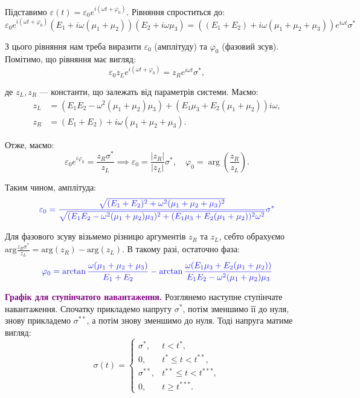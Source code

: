 \documentclass{hw_template}
\begin{document}
Підставимо $\varepsilon(t) = \varepsilon_0 e^{i(\omega t + \varphi_0)}$. Рівняння спроститься до:
\begin{equation*}
    \varepsilon_0e^{i(\omega t + \varphi_0)}(E_1+i\omega(\mu_1+\mu_2))(E_2+i\omega \mu_3) = \left((E_1 + E_2) + i\omega\left(\mu_1+\mu_2+\mu_3\right)\right)e^{i\omega t}\sigma^*
\end{equation*}

З цього рівняння нам треба виразити $\varepsilon_0$ (амплітуду) та $\varphi_0$ (фазовий зсув). Помітимо, що рівняння має вигляд:
\begin{equation*}
    \varepsilon_0z_L e^{i(\omega t + \varphi_0)} = z_R e^{i\omega t}\sigma^*,
\end{equation*}

де $z_L,z_R$ --- константи, що залежать від параметрів системи. Маємо:
\begin{align*}
    z_L &= (E_1E_2 - \omega^2(\mu_1+\mu_2)\mu_3) + (E_1\mu_3 + E_2(\mu_1+\mu_2))i\omega, \\
    z_R &= (E_1 + E_2) + i\omega(\mu_1+\mu_2+\mu_3).
\end{align*}

Отже, маємо:
\begin{equation*}
    \varepsilon_0 e^{i\varphi_0} = \frac{z_R\sigma^*}{z_L} \implies \varepsilon_0 = \frac{|z_R|}{|z_L|}\sigma^*, \quad \varphi_0 = \arg\left(\frac{z_R}{z_L}\right).
\end{equation*}

Таким чином, амплітуда:
\begin{equation*}
    \textcolor{blue!90!white}{\varepsilon_0 = \frac{\sqrt{(E_1 + E_2)^2 + \omega^2(\mu_1+\mu_2+\mu_3)^2}}{\sqrt{(E_1E_2 - \omega^2(\mu_1+\mu_2)\mu_3)^2 + (E_1\mu_3 + E_2(\mu_1+\mu_2))^2\omega^2}}\sigma^*}
\end{equation*}

Для фазового зсуву візьмемо різницю аргументів $z_R$ та $z_L$, себто обрахуємо $\text{arg} \frac{z_R\sigma^*}{z_L} = \text{arg}(z_R) - \text{arg}(z_L)$. В такому разі, остаточно фаза:
\begin{equation*}
    \textcolor{blue!90!white}{\varphi_0 = \arctan \frac{\omega(\mu_1+\mu_2+\mu_3)}{E_1+E_2} - \arctan \frac{\omega(E_1\mu_3 + E_2(\mu_1+\mu_2))}{E_1E_2 - \omega^2(\mu_1+\mu_2)\mu_3}}
\end{equation*}

\newpage

\textcolor{purple}{\textbf{Графік для ступінчатого навантаження.}} Розглянемо
наступне ступінчате навантаження. Спочатку прикладемо напругу $\sigma^*$, потім 
зменшимо її до нуля, знову прикладемо $\sigma^{**}$, а потім знову зменшимо до нуля.
Тоді напруга матиме вигляд:
\begin{equation*}
    \sigma(t) = \begin{cases}
        \sigma^*, & t < t^*, \\
        0, & t^* \leq t < t^{**}, \\
        \sigma^{**}, & t^{**} \leq t < t^{***}, \\
        0, & t \geq t^{***}.
    \end{cases}
\end{equation*}
\end{document}
